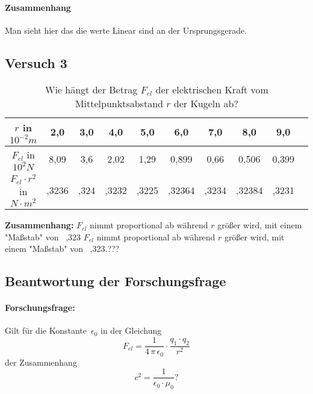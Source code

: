 \documentclass[a4paper]{report}
\begin{document}
\paragraph{Zusammenhang} Man sieht hier das die werte Linear sind an der Ursprungsgerade.


\subsection{Versuch 3}
\begin{table}[h!]
	\setlength{\tabcolsep}{15pt}
	\renewcommand{\arraystretch}{2.2}
	\centering
	\begin{tabular}{|c|c|c|c|c|c|c|c|c|c|}
		\hline
    $r$ in $10^{-2}m$ & 2,0 & 3,0 & 4,0 & 5,0 & 6,0 & 7,0 & 8,0 & 9,0 \\
		\hline 
    $F_{el}$ in $10^2N$ & 8,09 & 3,6 & 2,02 & 1,29 & 0,899 & 0,66 & 0,506 & 0,399 \\
		\hline 
    $F_{el}\cdot r^2$ in $N\cdot m^2$ & ,3236 & ,324 & ,3232 & ,3225 & ,32364 & ,3234 & ,32384 & ,3231 \\
		\hline
	\end{tabular}
	\caption{Wie hängt der Betrag $F_{el}$ der elektrischen Kraft vom Mittelpunktsabstand $r$ der Kugeln ab?}
	\label{tab:table-tab-3-2}
\end{table}


\noindent\textbf{Zusammenhang:} $F_{el}$ nimmt proportional ab während $r$ größer wird,
mit einem "Maßstab" von ~,323 $F_{el}$ nimmt proportional ab während $r$ größer
wird, mit einem "Maßstab" von ~,323.???

\clearpage
\subsection{Beantwortung der Forschungsfrage}
\paragraph{Forschungsfrage:} 
Gilt für die Konstante~$\epsilon_0$ in der Gleichung 
	$$F_{el} = \dfrac{1}{4 \, \pi \, \epsilon_0} \cdot \dfrac{q_1 \cdot q_2}{r^2}$$ 
	der Zusammenhang
	$$c^2 = \dfrac{1}{\epsilon_0 \cdot \mu_0}?$$ 
\end{document}
